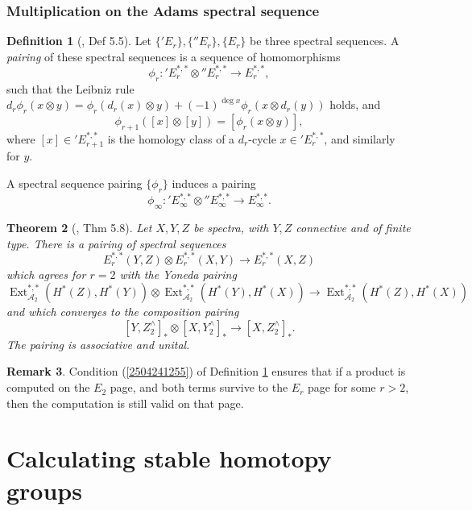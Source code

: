 \documentclass[11pt, titlepage]{article} %
\def\A{\ensuremath{\mathscr{A}_2}}
\DeclareMathOperator{\Ext}{Ext}
\numberwithin{equation}{subsection}
\theoremstyle{plain}
\newtheorem{theorem}{Theorem}[subsection]
\theoremstyle{definition}
\newtheorem{definition}[theorem]{Definition}
\newtheorem{remark}[theorem]{Remark}
\begin{document}
\subsubsection{Multiplication on the Adams spectral sequence}

\begin{definition}[{\autocite{ass}, Def 5.5}]\label{2504241258}
Let \(\{'E_r\}, \{''E_r\}, \{E_r\}\) be three spectral sequences. A \textit{pairing} of these spectral sequences is a sequence of homomorphisms 
\[\phi_r : \text{}'E_r^{*,*}\otimes \text{}''E_r^{*,*} \to E_r^{*,*},\]
such that the Leibniz rule \(d_r\phi_r(x\otimes y)=\phi_r(d_r(x)\otimes y)+(-1)^{\deg x}\phi_r(x\otimes d_r(y))\) holds, and
\begin{equation}\label{2504241255}
\phi_{r+1}([x]\otimes[y])=[\phi_r(x\otimes y)],
\end{equation}
where \([x]\in \text{}'E_{r+1}^{*,*}\) is the homology class of a \(d_r\)-cycle \(x\in \text{}'E_r^{*,*}\), and similarly for \(y\).
\end{definition}

A spectral sequence pairing \(\{\phi_r\}\) induces a pairing 
\[\phi_\infty : \text{}'E_\infty^{*,*}\otimes \text{}''E^{*,*}_\infty \to E^{*,*}_\infty.\]

\begin{theorem}[{\autocite{ass}, Thm 5.8}]\label{2505080302dontjudge}
Let \(X,Y,Z\) be spectra, with \(Y, Z\) connective and of finite type. There is a pairing of spectral sequences
\[E^{*,*}_r(Y,Z)\otimes E^{*,*}_r(X,Y)\to E^{*,*}_r(X,Z)\]
which agrees for \(r=2\) with the Yoneda pairing
\[\Ext^{*,*}_{\A}(H^*(Z), H^*(Y))\otimes \Ext_{\A}^{*,*}(H^*(Y), H^*(X))\to \Ext_{\A}^{*,*}(H^*(Z), H^*(X))\]
and which converges to the composition pairing
\[[Y, Z^\wedge_2]_*\otimes [X,Y^\wedge_2]_* \to [X, Z^\wedge_2]_*.\]
The pairing is associative and unital.
\end{theorem}

\begin{remark}\label{2505080303}
Condition (\ref{2504241255}) of Definition \ref{2504241258} ensures that if a product is computed on the \(E_2\) page, and both terms survive to the \(E_r\) page for some \(r>2\), then the computation is still valid on that page.
\end{remark}

\section{Calculating stable homotopy groups}
\end{document}
